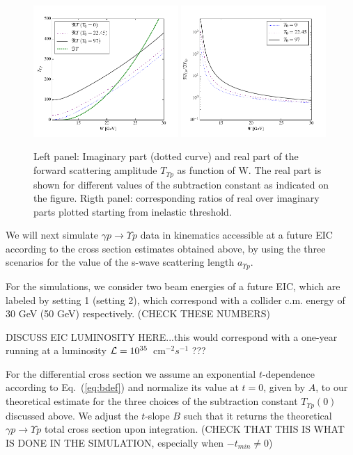 \documentclass[10pt,prd,aps,nofootinbib,superscriptaddress]{revtex4}
\begin{document}
\begin{figure}[h]
\includegraphics[width=0.49\textwidth]{t_y.pdf}
\includegraphics[width=0.49\textwidth]{reimt_y.pdf}
\caption{Left panel:
Imaginary part (dotted curve) and real part of the forward scattering amplitude $T_{\Upsilon p}$ as function of W.
The real part is shown for different values of the subtraction constant as indicated on the figure.
Rigth panel: corresponding ratios of real over imaginary parts plotted starting from inelastic threshold.}
\label{fig:psip_psip}
\end{figure}



We will next simulate $\gamma p \to \Upsilon p$ data in kinematics accessible at a future EIC according to the cross section estimates obtained above, by using the three scenarios for the value of the s-wave scattering length $a_{\Upsilon p}$. 


For the simulations, we consider two beam energies of a future EIC, which are labeled by setting 1 (setting 2), which 
correspond with a collider c.m. energy of 30 GeV (50 GeV) respectively. {\color{red} (CHECK THESE NUMBERS)} 

{\color{red} DISCUSS EIC LUMINOSITY HERE...this would correspond with a one-year running at a luminosity 
${\cal L} = 10^{35}$~cm$^{-2} s^{-1}$ ???   }

For the differential cross section we assume an exponential $t$-dependence according to Eq.~(\ref{eq:bdef}) and normalize its 
value at $t = 0$, given by $A$, to our theoretical estimate for the three choices of the subtraction constant 
$T_{\Upsilon p} (0)$ discussed above. We adjust the $t$-slope $B$ such that it returns the theoretical $\gamma p \to \Upsilon p$ 
total cross section upon integration.  
{\color{red} (CHECK THAT THIS IS WHAT IS DONE IN THE SIMULATION, especially when $-t_{min} \neq 0$)}
\end{document}

